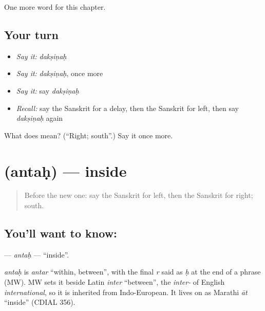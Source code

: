 \begin{grammarlens}[title={What you've built}]
One more word for this chapter.
\end{grammarlens}

\subsection*{Your turn}
\begin{itemize}
\raggedright
  \item \emph{Say it:} \emph{dakṣiṇaḥ}
  \item \emph{Say it:} \emph{dakṣiṇaḥ}, once more
  \item \emph{Say it:} say \emph{dakṣiṇaḥ}
  \item \emph{Recall:} say the Sanskrit for a delay, then the Sanskrit for left, then say \emph{dakṣiṇaḥ} again
\end{itemize}

\begin{tcolorbox}[breakable,colback=teal!4,colframe=teal!35!black,title={Before you move on}]
What does  mean? (\textquotedblleft{}Right; south\textquotedblright{}.) Say it once more.
\end{tcolorbox}
\section[\texorpdfstring{\sk{अन्तः} (antaḥ)}{अन्तः (antaḥ)}]{ (antaḥ) — inside}

\label{lesson:SA-C93-antah}



\begin{quote}
Before the new one: say the Sanskrit for left, then the Sanskrit for right; south.
\end{quote}

\subsection*{You'll want to know: }
\textbf{} — \emph{antaḥ} — \textquotedblleft{}inside\textquotedblright{}.

\begin{cousinweb}
\emph{antaḥ} is \emph{antar} \textquotedblleft{}within, between\textquotedblright{}, with the final \emph{r} said as \emph{ḥ} at the end of a phrase (MW). MW sets it beside Latin \emph{inter} \textquotedblleft{}between\textquotedblright{}, the \emph{inter-} of English \emph{international}, so it is inherited from Indo-European. It lives on as Marathi \emph{āt} \textquotedblleft{}inside\textquotedblright{} (CDIAL 356).
\end{cousinweb}

